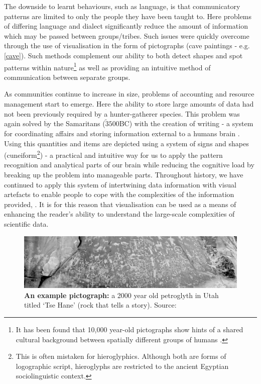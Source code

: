 The downside to learnt behaviours, such as language, is that communicatory patterns are limited to only the people they have been taught to. Here problems of differing language and dialect significantly reduce the amount of information which may be passed between groups/tribes. Such issues were quickly overcome through the use of visualisation in the form of pictographs (cave paintings - e.g. \autoref{cave}). Such methods complement our ability to both detect shapes and spot patterns within nature\footnote{It has been found that 10,000 year-old pictographs show hints of a shared cultural background between spatially different groups of humans \citep{cave}.} as well as providing an intuitive method of communication between separate groups.


As communities continue to increase in size, problems of accounting and resource management start to emerge. Here the ability to store large amounts of data had not been previously required by a hunter-gatherer species. This problem was again solved by the Samaritans ($\tilde 3500$BC) with the creation of writing - a system for coordinating affairs and storing information external to a humans brain \citep{archaic,beforeCuneiform}. Using this quantities and items are depicted using a system of signs and shapes (cuneiform\footnote{This is often mistaken for hieroglyphics. Although both are forms of logographic script, hieroglyphs are restricted to the ancient Egyptian sociolinguistic context. }) - a practical and intuitive way for us to apply the pattern recognition and analytical parts of our brain while reducing the cognitive load by breaking up the problem into manageable parts.
Throughout history, we have continued to apply this system of intertwining data information with visual artefacts to enable people to cope with the complexities of the information provided, \citep{tufte}. It is for this reason that visualisation can be used as a means of enhancing the reader's ability to understand the large-scale complexities of scientific data.


\begin{figure}[H]
         \centering
         \includegraphics[width=\textwidth]{figures_c1/newspaperrock.jpg}
        \caption{\textbf{An example pictograph:} a 2000 year old petroglyth in Utah titled `Tse Hane' (rock that tells a story). Source:
        \citep{newspaperrock} }
        \label{cave}
\end{figure}


